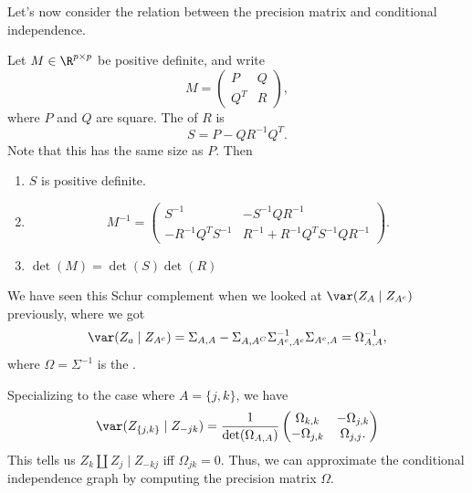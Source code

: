 \documentclass[a4paper]{article}
\begin{document}
Let's now consider the relation between the precision matrix and conditional independence.
\begin{prop}
  Let $M \in \R^{p \times p}$ be positive definite, and write
  \[
    M =
    \begin{pmatrix}
      P & Q\\
      Q^T & R
    \end{pmatrix},
  \]
  where $P$ and $Q$ are square. The  of $R$ is
  \[
    S = P - QR^{-1} Q^T.
  \]
  Note that this has the same size as $P$. Then
  \begin{enumerate}
    \item $S$ is positive definite.
    \item
      \[
        M^{-1} =
        \begin{pmatrix}
          S^{-1} & -S^{-1} QR^{-1}\\
          -R^{-1} Q^T S^{-1} & R^{-1} + R^{-1} Q^T S^{-1} Q R^{-1}
        \end{pmatrix}.
      \]
    \item $\det(M) = \det (S) \det (R)$
  \end{enumerate}
\end{prop}
We have seen this Schur complement when we looked at $\var(Z_A \mid Z_{A^c})$ previously, where we got
\[
  \var(Z_a \mid Z_{A^c}) = \Sigma_{A, A} - \Sigma_{A, A^C} \Sigma_{A^c, A^c}^{-1} \Sigma_{A^c, A} = \Omega_{A, A}^{-1},
\]
where $\Omega = \Sigma^{-1}$ is the .

Specializing to the case where $A = \{j, k\}$, we have
\[
  \var(Z_{\{j, k\}} \mid Z_{-jk}) = \frac{1}{\det (\Omega_{A, A})}
  \begin{pmatrix}
    \Omega_{k, k} & -\Omega_{j, k}\\
    -\Omega_{j, k} & \Omega_{j, j}.
  \end{pmatrix}
\]
This tells us $Z_k \amalg Z_j \mid Z_{-kj}$ iff $\Omega_{j k} = 0$. Thus, we can approximate the conditional independence graph by computing the precision matrix $\Omega$.
\end{document}
